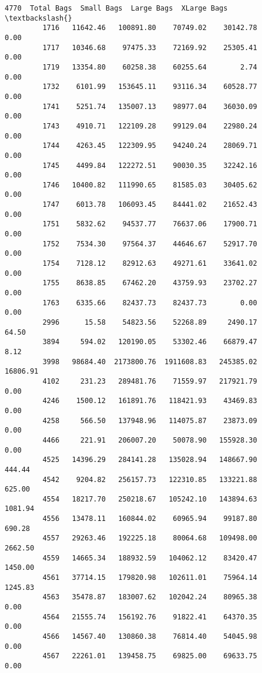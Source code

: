 \documentclass[11pt]{article}
\begin{document}
\begin{Verbatim}[commandchars=\\\{\}]
                    4770  Total Bags  Small Bags  Large Bags  XLarge Bags  \textbackslash{}
         1716   11642.46   100891.80    70749.02    30142.78         0.00   
         1717   10346.68    97475.33    72169.92    25305.41         0.00   
         1719   13354.80    60258.38    60255.64        2.74         0.00   
         1732    6101.99   153645.11    93116.34    60528.77         0.00   
         1741    5251.74   135007.13    98977.04    36030.09         0.00   
         1743    4910.71   122109.28    99129.04    22980.24         0.00   
         1744    4263.45   122309.95    94240.24    28069.71         0.00   
         1745    4499.84   122272.51    90030.35    32242.16         0.00   
         1746   10400.82   111990.65    81585.03    30405.62         0.00   
         1747    6013.78   106093.45    84441.02    21652.43         0.00   
         1751    5832.62    94537.77    76637.06    17900.71         0.00   
         1752    7534.30    97564.37    44646.67    52917.70         0.00   
         1754    7128.12    82912.63    49271.61    33641.02         0.00   
         1755    8638.85    67462.20    43759.93    23702.27         0.00   
         1763    6335.66    82437.73    82437.73        0.00         0.00   
         2996      15.58    54823.56    52268.89     2490.17        64.50   
         3894     594.02   120190.05    53302.46    66879.47         8.12   
         3998   98684.40  2173800.76  1911608.83   245385.02     16806.91   
         4102     231.23   289481.76    71559.97   217921.79         0.00   
         4246    1500.12   161891.76   118421.93    43469.83         0.00   
         4258     566.50   137948.96   114075.87    23873.09         0.00   
         4466     221.91   206007.20    50078.90   155928.30         0.00   
         4525   14396.29   284141.28   135028.94   148667.90       444.44   
         4542    9204.82   256157.73   122310.85   133221.88       625.00   
         4554   18217.70   250218.67   105242.10   143894.63      1081.94   
         4556   13478.11   160844.02    60965.94    99187.80       690.28   
         4557   29263.46   192225.18    80064.68   109498.00      2662.50   
         4559   14665.34   188932.59   104062.12    83420.47      1450.00   
         4561   37714.15   179820.98   102611.01    75964.14      1245.83   
         4563   35478.87   183007.62   102042.24    80965.38         0.00   
         4564   21555.74   156192.76    91822.41    64370.35         0.00   
         4566   14567.40   130860.38    76814.40    54045.98         0.00   
         4567   22261.01   139458.75    69825.00    69633.75         0.00   

\end{Verbatim}
\end{document}
